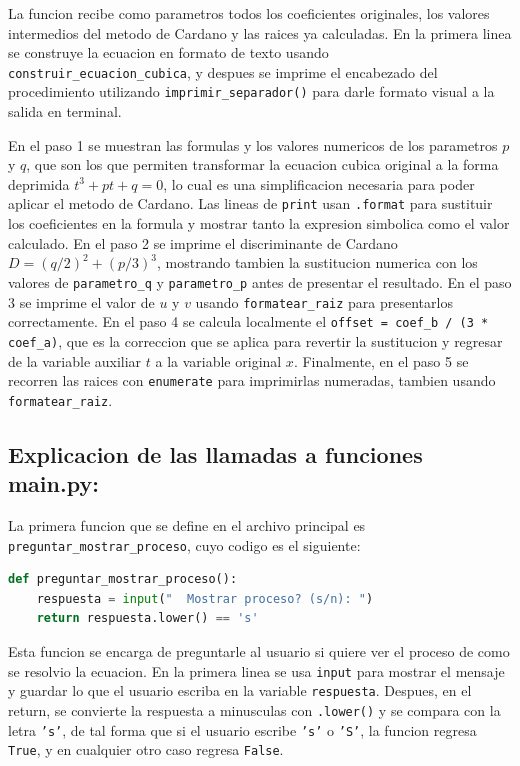 \documentclass[letterpaper,12pt]{article}
\begin{document}
    La funcion recibe como parametros todos los coeficientes originales, los valores intermedios del metodo de Cardano y las raices ya calculadas. En la primera linea se construye la ecuacion en formato de texto usando \texttt{construir\_ecuacion\_cubica}, y despues se imprime el encabezado del procedimiento utilizando \texttt{imprimir\_separador()} para darle formato visual a la salida en terminal.

    En el paso 1 se muestran las formulas y los valores numericos de los parametros $p$ y $q$, que son los que permiten transformar la ecuacion cubica original a la forma deprimida $t^3 + pt + q = 0$, lo cual es una simplificacion necesaria para poder aplicar el metodo de Cardano. Las lineas de \texttt{print} usan \texttt{.format} para sustituir los coeficientes en la formula y mostrar tanto la expresion simbolica como el valor calculado. En el paso 2 se imprime el discriminante de Cardano $D = (q/2)^2 + (p/3)^3$, mostrando tambien la sustitucion numerica con los valores de \texttt{parametro\_q} y \texttt{parametro\_p} antes de presentar el resultado. En el paso 3 se imprime el valor de $u$ y $v$ usando \texttt{formatear\_raiz} para presentarlos correctamente. En el paso 4 se calcula localmente el \texttt{offset = coef\_b / (3 * coef\_a)}, que es la correccion que se aplica para revertir la sustitucion y regresar de la variable auxiliar $t$ a la variable original $x$. Finalmente, en el paso 5 se recorren las raices con \texttt{enumerate} para imprimirlas numeradas, tambien usando \texttt{formatear\_raiz}.

    \subsection{Explicacion de las llamadas a funciones main.py:}

    La primera funcion que se define en el archivo principal es \texttt{preguntar\_mostrar\_proceso}, cuyo codigo es el siguiente:

    \begin{lstlisting}[language=Python, basicstyle=\ttfamily\scriptsize, caption={Función para preguntar si se muestra el proceso}, label={lst:preguntar_proceso}]
def preguntar_mostrar_proceso():
    respuesta = input("  Mostrar proceso? (s/n): ")
    return respuesta.lower() == 's'
    \end{lstlisting}

    Esta funcion se encarga de preguntarle al usuario si quiere ver el proceso de como se resolvio la ecuacion. En la primera linea se usa \texttt{input} para mostrar el mensaje y guardar lo que el usuario escriba en la variable \texttt{respuesta}. Despues, en el return, se convierte la respuesta a minusculas con \texttt{.lower()} y se compara con la letra \texttt{'s'}, de tal forma que si el usuario escribe \texttt{'s'} o \texttt{'S'}, la funcion regresa \texttt{True}, y en cualquier otro caso regresa \texttt{False}.
\end{document}
